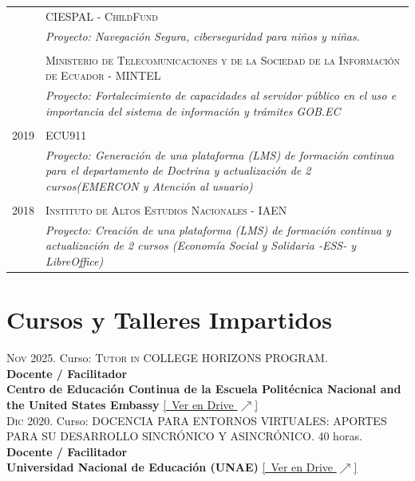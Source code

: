 \documentclass[a4paper]{article}
\begin{document}
\begin{longtable}{r|p{12cm}}

\textsc{2019} &  \textsc{Ministerio de Telecomunicaciones y de la Sociedad de la Información de Ecuador - MINTEL} \\&\emph{Proyecto: Fortalecimiento de capacidades al servidor público en el uso e importancia del sistema de información y trámites GOB.EC}\\\multicolumn{2}{c}{} \\

\textsc{2019} &  \textsc{ECU911} \\&\emph{Proyecto: Generación de una plataforma (LMS) de formación continua para el departamento de Doctrina y actualización de 2 cursos(EMERCON y Atención al usuario)}\\\multicolumn{2}{c}{} \\

\textsc{2018} &  \textsc{Instituto de Altos Estudios Nacionales - IAEN} \\&\emph{Proyecto: Creación de una plataforma (LMS) de formación continua y actualización de 2 cursos (Economía Social y Solidaria -ESS- y LibreOffice)}\\

\end{longtable}




\section{Cursos y Talleres Impartidos}

\textsc{Nov} 2025. Curso: \textsc{Tutor in COLLEGE HORIZONS PROGRAM}.\\
\textbf{Docente / Facilitador}\\
\textbf{Centro de Educación Continua de la Escuela Politécnica Nacional and the United States Embassy} \small \href{https://drive.google.com/file/d/10Uf9F64cO1Ngz4uJcIfl83tZk3EQ3b-i/view}{[\faGoogleDrive~Ver en Drive $\nearrow$]} \\[4pt]

\textsc{Dic} 2020. Curso: \textsc{DOCENCIA PARA ENTORNOS VIRTUALES: APORTES PARA SU DESARROLLO SINCRÓNICO Y ASINCRÓNICO}. 40 horas.\\
\textbf{Docente / Facilitador}\\
\textbf{Universidad Nacional de Educación (UNAE)} \small \href{https://drive.google.com/file/d/1UtJfxr1iCyaBofR5-F8IpdjNw3EILPhI/view}{[\faGoogleDrive~Ver en Drive $\nearrow$]} \\[4pt]
\end{document}

